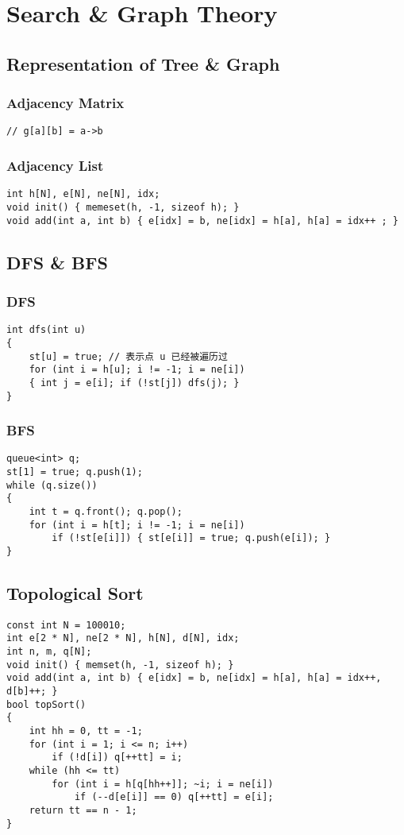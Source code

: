 \chapter{Search \& Graph Theory}\label{chap:Graph}
\section{Representation of Tree \& Graph}
\subsection{Adjacency Matrix}
\begin{lstlisting}
// g[a][b] = a->b
\end{lstlisting}
\subsection{Adjacency List}
\begin{lstlisting}
int h[N], e[N], ne[N], idx;
void init() { memeset(h, -1, sizeof h); }
void add(int a, int b) { e[idx] = b, ne[idx] = h[a], h[a] = idx++ ; }
\end{lstlisting}
\section{DFS \& BFS}
\subsection{DFS}
\begin{lstlisting}
int dfs(int u)
{
    st[u] = true; // 表示点 u 已经被遍历过
    for (int i = h[u]; i != -1; i = ne[i])
    { int j = e[i]; if (!st[j]) dfs(j); }
}
\end{lstlisting}
\subsection{BFS}
\begin{lstlisting}
queue<int> q;
st[1] = true; q.push(1);
while (q.size())
{
    int t = q.front(); q.pop();
    for (int i = h[t]; i != -1; i = ne[i])
        if (!st[e[i]]) { st[e[i]] = true; q.push(e[i]); }
}
\end{lstlisting}
\section{Topological Sort}
\begin{lstlisting}
const int N = 100010;
int e[2 * N], ne[2 * N], h[N], d[N], idx;
int n, m, q[N];
void init() { memset(h, -1, sizeof h); }
void add(int a, int b) { e[idx] = b, ne[idx] = h[a], h[a] = idx++, d[b]++; }
bool topSort()
{
    int hh = 0, tt = -1;
    for (int i = 1; i <= n; i++)
        if (!d[i]) q[++tt] = i;
    while (hh <= tt)
        for (int i = h[q[hh++]]; ~i; i = ne[i])
            if (--d[e[i]] == 0) q[++tt] = e[i];
    return tt == n - 1;
}
\end{lstlisting}
